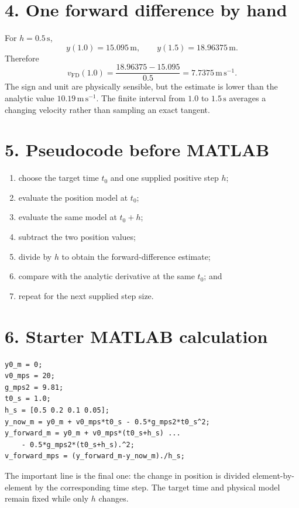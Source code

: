\documentclass[11pt,a4paper]{article}
\newcommand{\units}[1]{\,\mathrm{#1}}
\begin{document}
\section*{4. One forward difference by hand}
For $h=0.5\units{s}$,
\[
y(1.0)=15.095\units{m},\qquad y(1.5)=18.96375\units{m}.
\]
Therefore
\[
v_{\mathrm{FD}}(1.0)
=\frac{18.96375-15.095}{0.5}
=7.7375\units{m\,s^{-1}}.
\]
The sign and unit are physically sensible, but the estimate is lower than the analytic value $10.19\units{m\,s^{-1}}$. The finite interval from $1.0$ to $1.5\units{s}$ averages a changing velocity rather than sampling an exact tangent.

\section*{5. Pseudocode before MATLAB}
\begin{enumerate}[nosep,leftmargin=7mm]
\item choose the target time $t_0$ and one supplied positive step $h$;
\item evaluate the position model at $t_0$;
\item evaluate the same model at $t_0+h$;
\item subtract the two position values;
\item divide by $h$ to obtain the forward-difference estimate;
\item compare with the analytic derivative at the same $t_0$; and
\item repeat for the next supplied step size.
\end{enumerate}

\section*{6. Starter MATLAB calculation}
\begin{lstlisting}[style=matlabstyle,caption={Starter MATLAB calculation of forward differences for supplied time steps}]
y0_m = 0;
v0_mps = 20;
g_mps2 = 9.81;
t0_s = 1.0;
h_s = [0.5 0.2 0.1 0.05];
y_now_m = y0_m + v0_mps*t0_s - 0.5*g_mps2*t0_s^2;
y_forward_m = y0_m + v0_mps*(t0_s+h_s) ...
    - 0.5*g_mps2*(t0_s+h_s).^2;
v_forward_mps = (y_forward_m-y_now_m)./h_s;
\end{lstlisting}
The important line is the final one: the change in position is divided element-by-element by the corresponding time step. The target time and physical model remain fixed while only $h$ changes.

\end{document}
